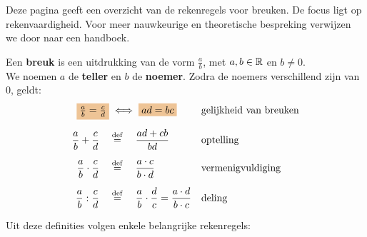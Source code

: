 \documentclass{ximera}
\begin{document}
	\author{Wiskundeplan}
    \label{xim:breuken_theorie}

Deze pagina geeft een overzicht van de rekenregels voor breuken. 
De focus ligt op rekenvaardigheid. Voor meer nauwkeurige en theoretische bespreking verwijzen we door naar een handboek. 


\begin{definition}\label{def:breuken}\nl
 
Een \textbf{breuk} is een uitdrukking van de vorm $\frac ab$,  met $a,b\in\mathbb{R}$  en $b\neq0$.
\\[2mm]
We noemen $a$ de \textbf{teller} en $b$ de \textbf{noemer}.
Zodra de noemers verschillend zijn van $0$, geldt:
\begin{align*}
        \important{\frac{a}{b} = \frac{c}{d}}  &\iff \important{ad = bc}
             &&\text{gelijkheid van breuken}
             \\[2mm]
        \frac{a}{b}+\frac{c}{d} \quad&\perdef\quad \frac{ad+cb}{bd}
             &&\text{optelling}
             \\[2mm]
        \frac{a}{b} \cdot \frac{c}{d} \quad&\perdef\quad \frac{a\cdot c}{b\cdot d}
             &&\text{vermenigvuldiging}
             \\[2mm]
        \frac{a}{b} : \frac{c}{d} \quad&\perdef\quad \frac ab \cdot \frac dc = \frac{a\cdot d}{b\cdot c}
             &&\text{deling}
\end{align*}

\end{definition}



Uit deze definities volgen enkele belangrijke rekenregels: 
\end{document}
